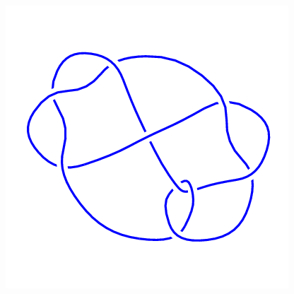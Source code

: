 \begin{figure}[H]
\begin{minipage}[b]{.18\linewidth}
	\end{minipage}
	\begin{minipage}[b]{.18\linewidth}
		\centering
		\includegraphics[width=\linewidth]{../data/9_20.png}
	\end{minipage}
\end{figure}
